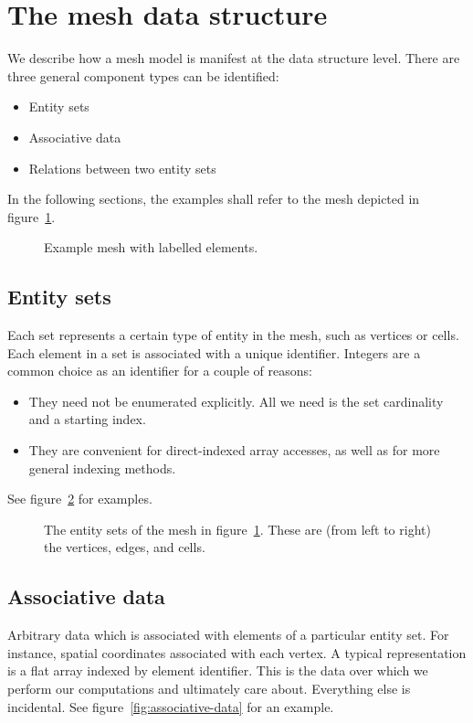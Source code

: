 \section{The mesh data structure}

We describe how a mesh model is manifest at the data structure level. There are three general component types can be identified:
\begin{itemize}
\item Entity sets
\item Associative data
\item Relations between two entity sets
\end{itemize}

In the following sections, the examples shall refer to the mesh depicted in figure~\ref{fig:example-mesh}.

\begin{figure}
    
    \caption{Example mesh with labelled elements.}
    \label{fig:example-mesh}
\end{figure}


\subsection{Entity sets}
Each set represents a certain type of entity in the mesh, such as vertices or cells. Each element in a set is associated with a unique identifier. Integers are a common choice as an identifier for a couple of reasons:
\begin{itemize}
\item They need not be enumerated explicitly. All we need is the set cardinality and a starting index.
\item They are convenient for direct-indexed array accesses, as well as for more general indexing methods.
\end{itemize}

See figure~\ref{fig:entity-sets} for examples.

\begin{figure}
    
    \caption{The entity sets of the mesh in figure~\ref{fig:example-mesh}. These are (from left to right) the vertices, edges, and cells.}
    \label{fig:entity-sets}
\end{figure}


\subsection{Associative data}
Arbitrary data which is associated with elements of a particular entity set. For instance, spatial coordinates associated with each vertex. A typical representation is a flat array indexed by element identifier.
This is the data over which we perform our computations and ultimately care about. Everything else is incidental.
See figure~\ref{fig:associative-data} for an example.

